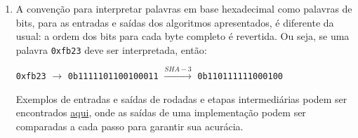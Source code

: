 \documentclass{article}
\begin{document}
\begin{enumerate}[label=(\alph*)]
\item A convenção para interpretar palavras em base hexadecimal como palavras
de bits, para as entradas e saídas dos algoritmos apresentados, é diferente da
usual: a ordem dos bits para cada byte completo é revertida. Ou seja, se uma
palavra \texttt{0xfb23} deve ser interpretada, então:

\texttt{0xfb23} $\longrightarrow$ \texttt{0b1111101100100011}
$\stackrel{SHA-3}{\longrightarrow}$ \texttt{0b110111111000100}

Exemplos de entradas e saídas de rodadas e etapas intermediárias podem ser
encontrados
\href{http://csrc.nist.gov/groups/ST/toolkit/examples.html#aHashing}
{aqui}, onde as saídas de uma implementação podem ser comparadas a cada passo
para garantir sua acurácia.

\end{enumerate}



\end{document}
